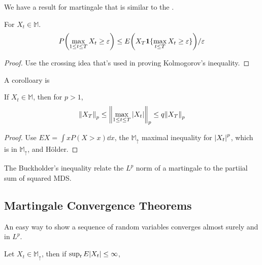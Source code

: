 We have a result for martingale that is similar to the . 
\begin{lemma}
    For \(X_{t} \in \mathbb{M}\). 
    \begin{equation*}
        P\pqty{\max_{1\leq t \leq T} X_{t} \geq \epsilon} \leq E\pqty{X_{T} \indicator{\max_{t\leq T} X_{t} \geq \epsilon }}/ \epsilon
    \end{equation*}
\end{lemma}
\begin{proof}
    Use the crossing idea that's used in proving Kolmogorov's inequality. 
\end{proof}

A corolloary is
\begin{lemma}
    If \(X_{t} \in \mathbb{M}\), then for \(p > 1\), 
    \begin{equation*}
        \norm{X_{T} }_{p} \leq \norm{\max_{1 \leq t\leq T} \abs{X_{t}}}_{p} \leq q \norm{X_{T}}_{p}
    \end{equation*}
\end{lemma}
\begin{proof}
    Use \(EX = \int x P(X > x) \dd{x}\), the \(\mathbb{M}_{\uparrow}\) maximal inequality for \(\abs{X_{t}}^{p}\), which is in \(\mathbb{M}_{\uparrow}\),  and Hölder. 
\end{proof}


The Buckholder's inequality relate the \(L^{p}\) norm of a martingale to the partiial sum of squared MDS. 
\begin{lemma}
    
\end{lemma}

\subsection{Martingale Convergence Theorems}
An easy way to show a sequence of random variables converges almost surely and in \(L^{p}\). 

\begin{thm}
    Let \(X_{t} \in \mathbb{M}_{\uparrow}\), then if \(\sup_{t} E\abs{X_{t}} \leq \infty\), 
\end{thm}

\begin{thm}
    
\end{thm}

